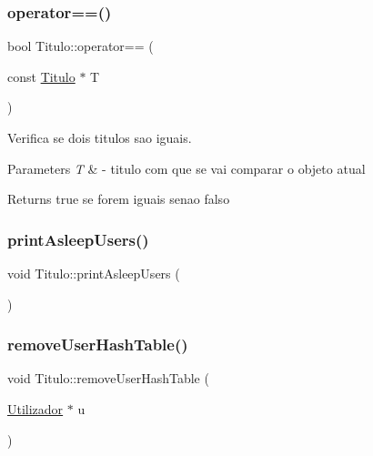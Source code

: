 \mbox{\label{class_titulo_ac0622a3b256910ac87ee900a9be014b6}} 
\subsubsection{\texorpdfstring{operator==()}{operator==()}}
{\footnotesize\ttfamily bool Titulo\+::operator== (\begin{DoxyParamCaption}\item[{const \mbox{\hyperlink{class_titulo}{Titulo}} $\ast$}]{T }\end{DoxyParamCaption})}



Verifica se dois titulos sao iguais. 


\begin{DoxyParams}{Parameters}
{\em T} & -\/ titulo com que se vai comparar o objeto atual \\
\hline
\end{DoxyParams}
\begin{DoxyReturn}{Returns}
true se forem iguais senao falso 
\end{DoxyReturn}
\mbox{\label{class_titulo_ab14d7a11d5b91dec67fb115cfa83d860}} 
\subsubsection{\texorpdfstring{print\+Asleep\+Users()}{printAsleepUsers()}}
{\footnotesize\ttfamily void Titulo\+::print\+Asleep\+Users (\begin{DoxyParamCaption}{ }\end{DoxyParamCaption})}

\mbox{\label{class_titulo_a66ee2ff7b95cf280a667dc87477a0ae1}} 
\subsubsection{\texorpdfstring{remove\+User\+Hash\+Table()}{removeUserHashTable()}}
{\footnotesize\ttfamily void Titulo\+::remove\+User\+Hash\+Table (\begin{DoxyParamCaption}\item[{\mbox{\hyperlink{class_utilizador}{Utilizador}} $\ast$}]{u }\end{DoxyParamCaption})}

